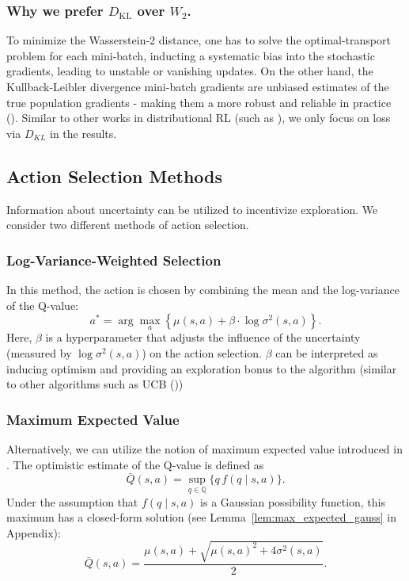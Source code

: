 \documentclass[11pt,a4paper]{report}
\begin{document}
\sloppy
\subsubsection*{Why we prefer $D_{\mathrm{KL}}$ over $W_2$.}
To minimize the Wasserstein-2 distance, one has to solve the optimal-transport problem for each mini-batch, inducting a systematic bias into the stochastic gradients, leading to unstable or vanishing updates. On the other hand, the Kullback-Leibler divergence mini-batch gradients are unbiased estimates of the true population gradients - making them a more robust and reliable in practice (\cite{bellemare2017cramer}). Similar to other works in distributional RL (such as \cite{bellemare2017}), we only focus on loss via $D_{KL}$ in the results.

\subsection{Action Selection Methods}

Information about uncertainty can be utilized to incentivize exploration. We consider two different methods of action selection.

\subsubsection{Log-Variance-Weighted Selection}
In this method, the action is chosen by combining the mean and the log-variance of the Q-value:
\[
  a^* = \arg\max_{a} \left\{ \mu(s, a) + \beta \cdot \log \sigma^2(s, a) \right\}.
\]
Here, \(\beta\) is a hyperparameter that adjusts the influence of the uncertainty (measured by \(\log \sigma^2(s,a)\)) on the action selection. $\beta$ can be interpreted as inducing optimism and providing an exploration bonus to the algorithm (similar to other algorithms such as UCB (\cite{peter2003})) 

\subsubsection{Maximum Expected Value}

\sloppy
Alternatively, we can utilize the notion of maximum expected value introduced in \cite{thomas2025}. The optimistic estimate of the Q-value is defined as
\[
  \bar{Q}(s,a) = \sup_{q \in \mathbb{Q}} \{ q \, f(q \mid s,a) \}.
\]
Under the assumption that \(f(q \mid s,a)\) is a Gaussian possibility function, this maximum has a closed-form solution (see Lemma~\ref{lem:max_expected_gauss} in Appendix):
\[
  \bar{Q}(s,a) = \frac{\mu(s,a) + \sqrt{\mu(s,a)^2 + 4\sigma^2(s,a)}}{2}.
\]
\end{document}
